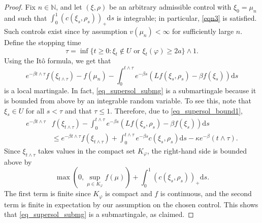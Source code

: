 \documentclass{article}
\theoremstyle{definition}
\numberwithin{equation}{section}
\numberwithin{theorem}{section}
\newcommand{\ds}{\mathrm{d}s}
\newcommand{\Nb}{\mathbb{N}}
\begin{document}
\begin{proof}
Fix $n\in\Nb$, and let $(\xi,\rho)$ be an arbitrary admissible control with $\xi_0=\mu_n$ and such that $\int_0^1 \left(c(\xi_s, \rho_s)\right)_+ \ds$ is integrable; in particular, \eqref{eqn3} is satisfied. Such controls exist since by assumption $v(\mu_n) < \infty$ for sufficiently large $n$. Define the stopping time
\[
\tau = \inf\{ t\ge0\colon \text{$\xi_t \notin U$ or $\xi_t(\varphi) \ge 2a$}\} \wedge 1.
\]
Using the It\^o formula, we get that
\begin{equation}\label{eq_supersol_submg}
e^{-\beta t\wedge\tau} f(\xi_{t\wedge\tau}) - f(\mu_n) - \int_0^{t\wedge\tau} e^{-\beta s} ( Lf(\xi_s,\rho_s) - \beta f(\xi_s)) \ds
\end{equation}
is a local martingale.  
In fact, \eqref{eq_supersol_submg} is a submartingale because it is bounded from above by an integrable random variable. To see this, note that $\xi_s \in U$ for all $s<\tau$ and that $\tau\le 1$. Therefore, due to \eqref{eq_supersol_bound1},
\begin{equation}\label{eq_supersol_bound2}
\begin{aligned}
e^{-\beta t\wedge\tau} & f(\xi_{t\wedge\tau})  - \int_0^{t\wedge\tau} e^{-\beta s} ( Lf(\xi_s,\rho_s) - \beta f(\xi_s)) \ds \\
&\le e^{-\beta t\wedge\tau} f(\xi_{t\wedge\tau}) + \int_0^{t\wedge\tau} e^{-\beta s}c(\xi_s,\rho_s) \ds - \kappa e^{-\beta} (t\wedge\tau).
\end{aligned}
\end{equation}
Since $\xi_{t\wedge\tau}$ takes values in the compact set $K_\varphi$, the right-hand side is bounded above by 
\begin{equation*}
\max(0,\sup_{\mu\in K_\varphi} f(\mu)) + \int_0^1 \left(c(\xi_s, \rho_s)\right)_+ \ds.
\end{equation*} 
The first term is finite since $K_\varphi$ is compact and $f$ is continuous, and the second term is finite in expectation by our assumption on the chosen control. This shows that \eqref{eq_supersol_submg} is a submartingale, as claimed.




\end{proof}
\end{document}
